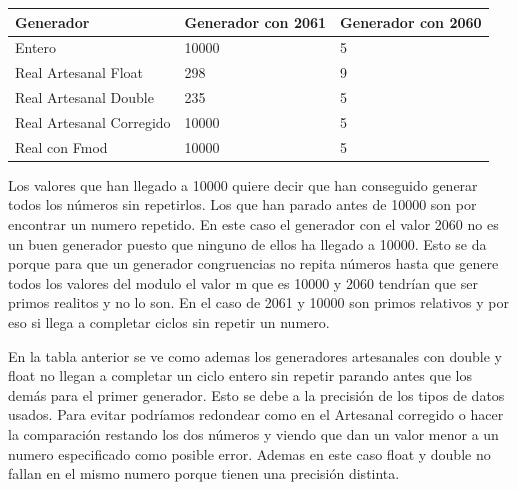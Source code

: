 \documentclass[]{article}
\begin{document}
\begin{table}[H]
	\begin{center}
		\begin{tabular}{|l|l|l|}
			
			\hline
			Generador & Generador con 2061 & Generador con 2060\\
			\hline \hline
			Entero & 10000  &  5
			\\ \hline
			Real Artesanal Float & 298 &  9
			\\ \hline
			Real Artesanal Double & 235  &  5
			\\ \hline
			Real Artesanal Corregido & 10000 &  5
			\\ \hline
			Real con Fmod & 10000  & 5
			\\ \hline
		\end{tabular}
		
		\label{tabla:sencilla}
	\end{center}
\end{table}

Los valores que han llegado a 10000 quiere decir que han conseguido generar todos los números sin repetirlos. Los que han parado antes de 10000 son por encontrar un numero repetido. En este caso el generador con el valor 2060 no es un buen generador puesto que ninguno de ellos ha llegado a 10000. Esto se da porque para que un generador congruencias no repita números hasta que genere todos los valores del modulo el valor m que es 10000 y 2060 tendrían que ser primos realitos y no lo son. En el caso de 2061 y 10000 son primos relativos y por eso si llega a completar ciclos sin repetir un numero. 

En la tabla anterior se ve como ademas los generadores artesanales con double y float no llegan a completar un ciclo entero sin repetir parando antes que los demás para el primer generador. Esto se debe a la precisión de los tipos de datos usados. Para evitar podríamos redondear como en el Artesanal corregido o hacer la comparación restando los dos números y viendo que dan un valor menor a un numero especificado como posible error. Ademas en este caso float y double no fallan en el mismo numero porque tienen una precisión distinta.
\end{document}
